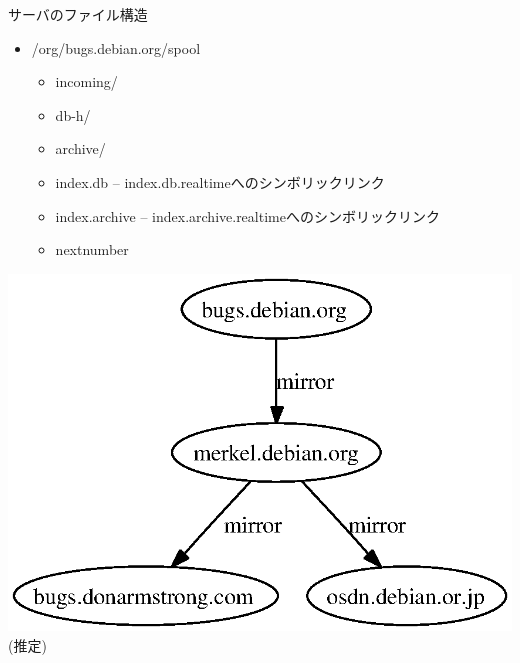 \documentclass[cjk,dvipdfmx]{beamer}
\begin{document}
\begin{frame}{サーバのファイル構造}
\begin{minipage}{0.5\hsize}
  \begin{itemize}
 \item /org/bugs.debian.org/spool
       \begin{itemize}
	\item incoming/
	\item db-h/
	\item archive/
	\item index.db -- index.db.realtimeへのシンボリックリンク
	\item index.archive -- index.archive.realtimeへのシンボリックリンク
	\item nextnumber
       \end{itemize}
 \end{itemize}
\end{minipage}
\begin{minipage}{0.45\hsize}
 \includegraphics[width=0.9\hsize]{image200611/mirror.eps}\\
\hfill{}(推定)
\end{minipage}
\end{frame}
\end{document}
